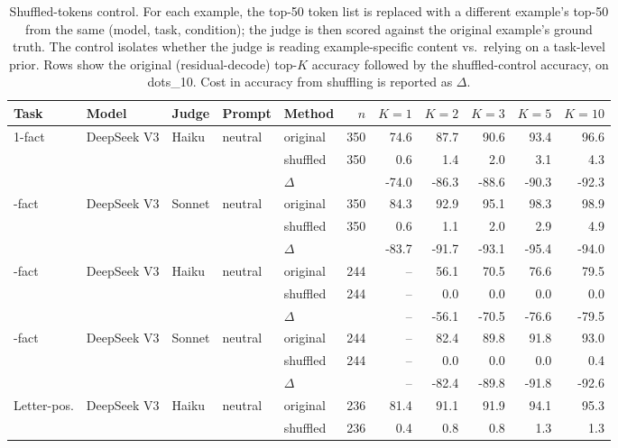 \begin{table}[h]
\centering
\small
\caption{Shuffled-tokens control. For each example, the top-50 token list is replaced with a different example's top-50 from the same (model, task, condition); the judge is then scored against the original example's ground truth. The control isolates whether the judge is reading example-specific content vs.\ relying on a task-level prior. Rows show the original (residual-decode) top-$K$ accuracy followed by the shuffled-control accuracy, on dots\_10. Cost in accuracy from shuffling is reported as $\Delta$.}
\label{tab:shuffled_control}
\begin{tabular}{l l l l l r r r r r r}
\toprule
Task & Model & Judge & Prompt & Method & $n$ & $K{=}1$ & $K{=}2$ & $K{=}3$ & $K{=}5$ & $K{=}10$ \\
\midrule
1-fact & DeepSeek V3 & Haiku & neutral & original & 350 & 74.6 & 87.7 & 90.6 & 93.4 & 96.6 \\
  &     &     &     & shuffled & 350 & 0.6 & 1.4 & 2.0 & 3.1 & 4.3 \\
  &     &     &     & $\Delta$ &  & -74.0 & -86.3 & -88.6 & -90.3 & -92.3 \\
\addlinespace[3pt]
1-fact & DeepSeek V3 & Sonnet & neutral & original & 350 & 84.3 & 92.9 & 95.1 & 98.3 & 98.9 \\
  &     &     &     & shuffled & 350 & 0.6 & 1.1 & 2.0 & 2.9 & 4.9 \\
  &     &     &     & $\Delta$ &  & -83.7 & -91.7 & -93.1 & -95.4 & -94.0 \\
\addlinespace[3pt]
2-fact & DeepSeek V3 & Haiku & neutral & original & 244 & -- & 56.1 & 70.5 & 76.6 & 79.5 \\
  &     &     &     & shuffled & 244 & -- & 0.0 & 0.0 & 0.0 & 0.0 \\
  &     &     &     & $\Delta$ &  & -- & -56.1 & -70.5 & -76.6 & -79.5 \\
\addlinespace[3pt]
2-fact & DeepSeek V3 & Sonnet & neutral & original & 244 & -- & 82.4 & 89.8 & 91.8 & 93.0 \\
  &     &     &     & shuffled & 244 & -- & 0.0 & 0.0 & 0.0 & 0.4 \\
  &     &     &     & $\Delta$ &  & -- & -82.4 & -89.8 & -91.8 & -92.6 \\
\addlinespace[3pt]
Letter-pos. & DeepSeek V3 & Haiku & neutral & original & 236 & 81.4 & 91.1 & 91.9 & 94.1 & 95.3 \\
  &     &     &     & shuffled & 236 & 0.4 & 0.8 & 0.8 & 1.3 & 1.3 \\

\end{tabular}
\end{table}
